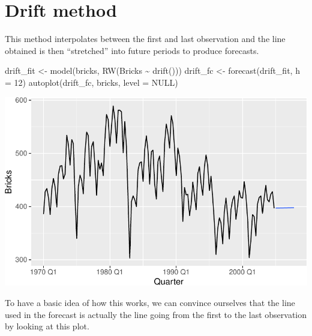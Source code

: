 \documentclass[
  letterpaper,
  DIV=11,
  numbers=noendperiod]{scrartcl}
\newenvironment{Shaded}{\begin{snugshade}}{\end{snugshade}}
\newcommand{\AttributeTok}[1]{\textcolor[rgb]{0.40,0.45,0.13}{#1}}
\newcommand{\ConstantTok}[1]{\textcolor[rgb]{0.56,0.35,0.01}{#1}}
\newcommand{\DecValTok}[1]{\textcolor[rgb]{0.68,0.00,0.00}{#1}}
\newcommand{\FunctionTok}[1]{\textcolor[rgb]{0.28,0.35,0.67}{#1}}
\newcommand{\NormalTok}[1]{\textcolor[rgb]{0.00,0.23,0.31}{#1}}
\newcommand{\OtherTok}[1]{\textcolor[rgb]{0.00,0.23,0.31}{#1}}
\newcommand{\SpecialCharTok}[1]{\textcolor[rgb]{0.37,0.37,0.37}{#1}}
\begin{document}
\section{Drift method}\label{drift-method}

This method interpolates between the first and last observation and the
line obtained is then ``stretched'' into future periods to produce
forecasts.

\begin{Shaded}
\begin{Highlighting}[]
\NormalTok{drift\_fit }\OtherTok{\textless{}{-}} \FunctionTok{model}\NormalTok{(bricks, }\FunctionTok{RW}\NormalTok{(Bricks }\SpecialCharTok{\textasciitilde{}} \FunctionTok{drift}\NormalTok{()))}
\NormalTok{drift\_fc }\OtherTok{\textless{}{-}} \FunctionTok{forecast}\NormalTok{(drift\_fit, }\AttributeTok{h =} \DecValTok{12}\NormalTok{)}
\FunctionTok{autoplot}\NormalTok{(drift\_fc, bricks, }\AttributeTok{level =} \ConstantTok{NULL}\NormalTok{)}
\end{Highlighting}
\end{Shaded}

\begin{center}
\includegraphics{chapter5_review_files/figure-pdf/unnamed-chunk-18-1.pdf}
\end{center}

To have a basic idea of how this works, we can convince ourselves that
the line used in the forecast is actually the line going from the first
to the last observation by looking at this plot.
\end{document}
